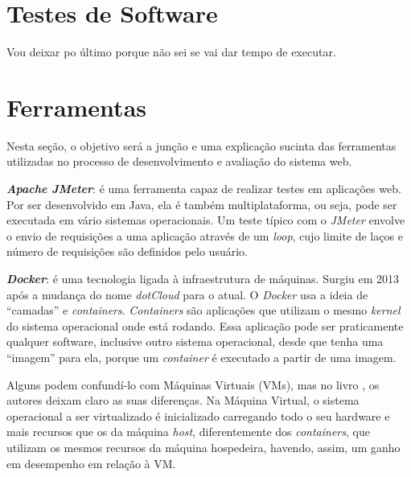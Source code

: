 \hspace{2.5cm}

\section{Testes de Software}
\label{sec:testessoftware}
\hspace{2.5cm}

Vou deixar po último porque não sei se vai dar tempo de executar.


\hspace{2.5cm}
\section{Ferramentas}
\label{sec:ferramentas}

\hspace{2.5cm}

Nesta seção, o objetivo será a junção e uma explicação sucinta das ferramentas utilizadas no processo de desenvolvimento e avaliação do sistema web.  



\textbf{\textit{Apache JMeter}}: é uma ferramenta capaz de realizar testes em aplicações web. Por ser desenvolvido em Java, 
ela é também multiplataforma, ou seja, pode ser executada em vário sistemas operacionais. Um teste típico com o \textit{JMeter} envolve o envio
de requisições a uma aplicação através de um \textit{loop}, cujo limite de laços e número de requisições são definidos pelo usuário.

%  

\textbf{\textit{Docker}}: é uma tecnologia ligada à infraestrutura de máquinas. Surgiu em 2013 após a mudança do nome \textit{dotCloud} para o atual. O \textit{Docker} usa a ideia de ``camadas'' e \textit{containers}. \textit{Containers} são aplicações que utilizam o mesmo \textit{kernel} do sistema operacional onde está rodando. Essa aplicação pode ser praticamente qualquer software, inclusive outro sistema operacional, desde que tenha uma ``imagem'' para ela, porque um \textit{container} é executado a partir de uma imagem.

Alguns podem confundí-lo com Máquinas Virtuais (VMs), mas no livro , os autores deixam claro as suas diferenças. Na Máquina Virtual, o sistema operacional a ser virtualizado é inicializado carregando todo o seu hardware e mais recursos que os da máquina \textit{host}, diferentemente dos \textit{containers}, que utilizam os mesmos recursos da máquina hospedeira, havendo, assim, um ganho em desempenho em relação à VM.

